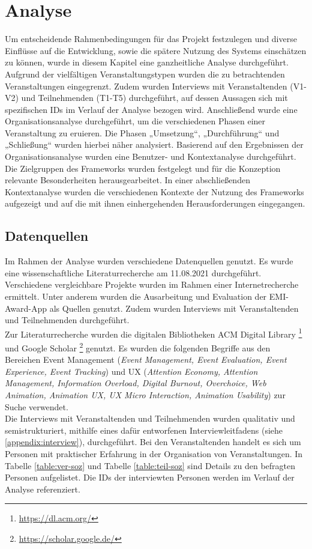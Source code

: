 \chapter{Analyse}

Um entscheidende Rahmenbedingungen für das Projekt festzulegen und
diverse Einflüsse auf die Entwicklung, sowie die spätere Nutzung des Systems
einschätzen zu können, wurde in diesem Kapitel eine ganzheitliche Analyse
durchgeführt. Aufgrund der vielfältigen Veranstaltungstypen wurden die zu
betrachtenden Veranstaltungen eingegrenzt. Zudem wurden Interviews mit
Veranstaltenden (V1-V2) und Teilnehmenden  (T1-T5) durchgeführt, auf dessen
Aussagen sich mit spezifischen IDs im Verlauf der Analyse bezogen wird.
Anschließend wurde eine Organisationsanalyse durchgeführt, um die verschiedenen
Phasen einer Veranstaltung zu eruieren. Die Phasen „Umsetzung“, „Durchführung“
und „Schließung“ wurden hierbei näher analysiert. Basierend auf den Ergebnissen
der Organisationsanalyse wurden eine Benutzer- und Kontextanalyse durchgeführt.
Die Zielgruppen des Frameworks wurden festgelegt und für die Konzeption
relevante Besonderheiten herausgearbeitet. In einer abschließenden
Kontextanalyse wurden die verschiedenen Kontexte der Nutzung des Frameworks
aufgezeigt und auf die mit ihnen einhergehenden Herausforderungen eingegangen.


\section{Datenquellen}

Im Rahmen der Analyse wurden verschiedene Datenquellen genutzt. Es wurde eine
wissenschaftliche Literaturrecherche am 11.08.2021 durchgeführt. Verschiedene
vergleichbare Projekte wurden im Rahmen einer Internetrecherche ermittelt. Unter
anderem wurden die Ausarbeitung und Evaluation der EMI-Award-App als Quellen
genutzt. Zudem wurden Interviews mit Veranstaltenden und Teilnehmenden
durchgeführt. \\
Zur Literaturrecherche wurden die digitalen Bibliotheken ACM Digital
Library \footnote{\url{https://dl.acm.org/}} und Google
Scholar \footnote{\url{https://scholar.google.de/}} genutzt. Es wurden die
folgenden Begriffe aus den Bereichen Event Management (\emph{Event Management,
    Event Evaluation, Event Experience, Event Tracking}) und UX (\emph{Attention
    Economy, Attention Management, Information Overload, Digital Burnout,
    Overchoice, Web Animation, Animation UX, UX Micro Interaction, Animation
    Usability}) zur Suche verwendet. \\
Die Interviews mit Veranstaltenden und Teilnehmenden wurden qualitativ und
semistrukturiert, mithilfe eines dafür entworfenen Interviewleitfadens (siehe
\autoref{appendix:interview}), durchgeführt. Bei den Veranstaltenden handelt es sich um Personen mit
praktischer Erfahrung in der Organisation von Veranstaltungen. In Tabelle
\ref{table:ver-soz} und Tabelle \ref{table:teil-soz} sind Details zu den
befragten Personen aufgelistet. Die IDs der interviewten Personen werden im
Verlauf der Analyse referenziert.

